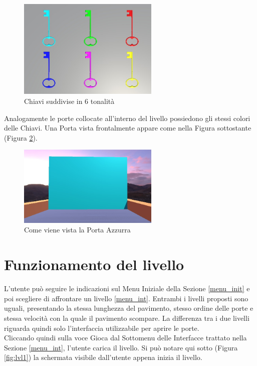 \documentclass[target=bach,aauheader=]{thud}
\begin{document}
\begin{figure}[h]
    \centering
    \includegraphics[width=0.60\textwidth]{keys}
    \caption{Chiavi suddivise in 6 tonalità}
    \label{fig:keys}
\end{figure}

Analogamente le porte collocate all'interno del livello possiedono gli stessi colori delle Chiavi.
Una Porta vista frontalmente appare come nella Figura sottostante (Figura \ref{fig:door}).

\begin{figure}[h]
    \centering
    \includegraphics[width=0.60\textwidth]{door}
    \caption{Come viene vista la Porta Azzurra}
    \label{fig:door}
\end{figure}

\section{Funzionamento del livello}
L'utente può seguire le indicazioni sul Menu Iniziale della Sezione \ref{menu_init} e poi scegliere di affrontare un livello \ref{menu_int}.
Entrambi i livelli proposti sono uguali, presentando la stessa lunghezza del pavimento, stesso ordine delle porte e stessa velocità con la quale il pavimento scompare.
La differenza tra i due livelli riguarda quindi solo l'interfaccia utilizzabile per aprire le porte. \\

Cliccando quindi sulla voce Gioca dal Sottomenu delle Interfacce trattato nella Sezione \ref{menu_int}, l'utente carica il livello.
Si può notare qui sotto (Figura \ref{fig:lvl1}) la schermata visibile dall'utente appena inizia il livello.
\end{document}
